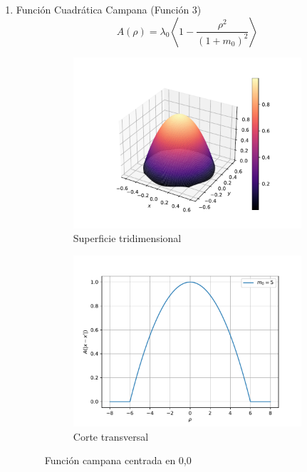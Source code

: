 \begin{enumerate}
	\item Función Cuadrática Campana (Función 3)
	\begin{equation}
		A(\rho)=\lambda_0\left<1-\frac{\rho^2}{(1+m_0)^2}\right>
	\end{equation}
	\begin{figure}
	    \centering
	    \sffamily
	    \begin{subfigure}{0.45\textwidth}
	    \centering
	        \includegraphics[width=\textwidth]{figuras/campana3d.pdf}
	        \caption{Superficie tridimensional}
	        \label{fig:campana.3d}
	    \end{subfigure}
	    \begin{subfigure}{0.45\textwidth}
	    \centering
	        \includegraphics[width=\textwidth]{figuras/campana2d.pdf}
	        \caption{Corte transversal}
	        \label{fig:campana.2d}
	    \end{subfigure}
	    \caption{Función campana centrada en 0,0}
	    \label{fig:campana}
	\end{figure}
\end{enumerate}

